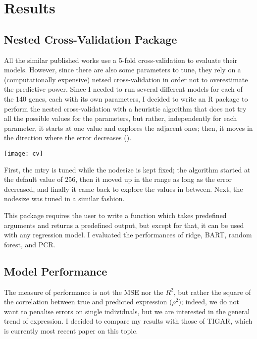 \section{Results}

\subsection{Nested Cross-Validation Package}

All the similar published works use a 5-fold cross-validation to 
evaluate their models. However, since there are also some parameters to 
tune, they rely on a (computationally expensive) netsed cross-validation 
in order not to overestimate the predictive power. Since I needed to run 
several different models for each of the 140 genes, each with its own 
parameters, I decided to write an R 
package to 
perform the nested cross-validation with a heuristic algorithm that does 
not try all the possible values for the parameters, but rather, 
independently for each parameter, it starts at one value and explores 
the adjacent ones; then, it moves in the direction where the error 
decreases
().

\begin{marginfigure}[-3.4cm]
  \centering
  \texttt{[image: cv]}
  \caption{First, the mtry is tuned while the nodesize is kept fixed; 
the algorithm started at the default value of 256, then it moved up in 
the range as long as the error decreased, and finally it came back to 
explore the values in between. Next, the nodesize was tuned in a similar 
fashion.}
\end{marginfigure}

This package requires the user to write a function which takes 
predefined arguments and returns a predefined output, but except for 
that, it can be used with any regression model. I evaluated the 
performances of ridge, BART, random forest, and PCR. 

\subsection{Model Performance}

The measure of performance is not the MSE nor the $R^2$, but rather the 
square of the correlation between true and predicted expression 
($\rho^2$); indeed, we do not want to penalise errors on single 
individuals, but we are interested in the general trend of expression. I 
decided to compare my results with those of TIGAR, \cite{Nagpal2019} 
which is currently most recent paper on this topic.

